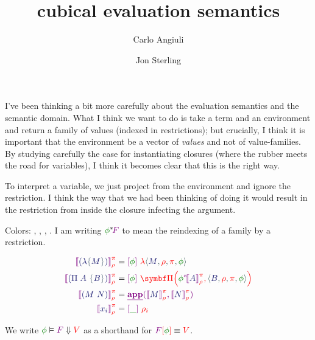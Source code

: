 \documentclass{article}
\title{cubical evaluation semantics}
\author{Carlo Angiuli \and Jon Sterling}
\newcommand\Eval[3]{
  \FmtFam{
    {\left\llbracket\FmtTm{#1}\right\rrbracket}_{\FmtVal{#2}}^{\FmtVal{#3}}
  }
}
\newcommand\ForceTest[3]{\FmtRst{#1}\vDash\FmtFam{#2}\Downarrow\FmtVal{#3}}
\begin{document}
\maketitle

I've been thinking a bit more carefully about the evaluation semantics and the
semantic domain. What I think we want to do is take a term and an environment
and return a family of values (indexed in restrictions); but crucially, I think
it is important that the environment be a vector of \emph{values} and not of
value-families. By studying carefully the case for instantiating closures
(where the rubber meets the road for variables), I think it becomes clear that
this is the right way.

To interpret a variable, we just project from the environment and ignore the
restriction. I think the way that we had been thinking of doing it would result
in the restriction from inside the closure infecting the argument.

\bigskip


Colors: , , ,
. I am writing $\Rst{\phi}{F}$ to mean the reindexing of a
family by a restriction.

\begin{align*}
  \Eval{
    \TLam{M}
  }{\rho}{\pi}
  &=
  \Fam{\phi}{
    \VLam{
      \VClo{M}{\rho}{\pi}{\phi}
    }
  }
  \\
  \Eval{
    \TPi{A}{B}
  }{\rho}{\pi}
  &=
  \Fam{\phi}{
    \VPi{
      \Rst{\phi}{\Eval{A}{\rho}{\pi}}
    }{
      \VClo{B}{\rho}{\pi}{\phi}
    }
  }
  \\
  \Eval{
    \TApp{M}{N}
  }{\rho}{\pi}
  &=
  \SemApp{
    \Eval{M}{\rho}{\pi}
  }{
    \Eval{N}{\rho}{\pi}
  }
  \\
  \Eval{
    \TVar{i}
  }{\rho}{\pi}
  &=
  \Fam{\_}{
    \rho_i
  }
\end{align*}

We write $\ForceTest{\phi}{F}{V}$ as a shorthand for
$\FamTest{F}{\phi}\equiv\FmtVal{V}$.
\end{document}

